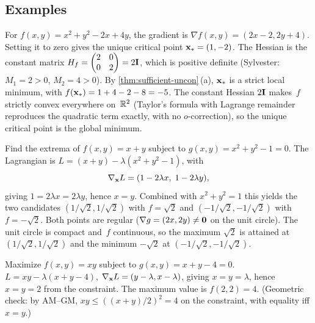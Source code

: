 \subsection*{Examples}

\begin{example}
\label{ex:uncon-quadratic}
For $f(x, y) = x^2 + y^2 - 2x + 4y$, the gradient is
$\nabla f(x, y) = (2x - 2, 2y + 4)$. Setting it to zero gives the
unique critical point $\mathbf{x}_* = (1, -2)$. The Hessian is the
constant matrix $H_f = \begin{pmatrix} 2 & 0 \\ 0 & 2 \end{pmatrix} = 2 \mathbf{I}$,
which is positive definite (Sylvester: $M_1 = 2 > 0$, $M_2 = 4 > 0$).
By \cref{thm:sufficient-uncon}\,(a), $\mathbf{x}_*$ is a strict local
minimum, with $f(\mathbf{x}_*) = 1 + 4 - 2 - 8 = -5$. The constant
Hessian $2\mathbf{I}$ makes~$f$ strictly convex everywhere on~$\mathbb{R}^2$
(Taylor's formula with Lagrange remainder reproduces the quadratic
term exactly, with no $o$-correction), so the unique critical point is
the global minimum.
\end{example}

\begin{example}
\label{ex:lagrange-circle}
Find the extrema of $f(x, y) = x + y$ subject to
$g(x, y) = x^2 + y^2 - 1 = 0$. The Lagrangian is
$L = (x + y) - \lambda(x^2 + y^2 - 1)$, with
\[
  \nabla_{\mathbf{x}} L = (1 - 2\lambda x,\; 1 - 2\lambda y),
\]
giving $1 = 2\lambda x = 2 \lambda y$, hence $x = y$. Combined with
$x^2 + y^2 = 1$ this yields the two candidates
$(1/\sqrt{2}, 1/\sqrt{2})$ with $f = \sqrt{2}$ and
$(-1/\sqrt{2}, -1/\sqrt{2})$ with $f = -\sqrt{2}$. Both points are
regular ($\nabla g = (2x, 2y) \neq \mathbf{0}$ on the unit circle).
The unit circle is compact and~$f$ continuous, so the maximum
$\sqrt{2}$ is attained at $(1/\sqrt{2}, 1/\sqrt{2})$ and the minimum
$-\sqrt{2}$ at $(-1/\sqrt{2}, -1/\sqrt{2})$.
\end{example}

\begin{example}
\label{ex:lagrange-linear}
Maximize $f(x, y) = xy$ subject to $g(x, y) = x + y - 4 = 0$.
$L = xy - \lambda(x + y - 4)$, $\nabla_{\mathbf{x}} L = (y - \lambda, x - \lambda)$,
giving $x = y = \lambda$, hence $x = y = 2$ from the constraint. The
maximum value is $f(2, 2) = 4$. (Geometric check: by AM--GM,
$xy \le ((x + y)/2)^2 = 4$ on the constraint, with equality iff
$x = y$.)
\end{example}

